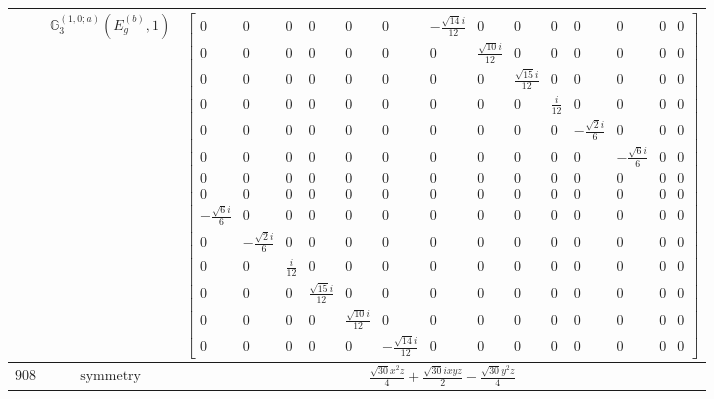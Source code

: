 \documentclass[fleqn,8pt,landscape]{jsarticle}
\begin{document}
\begin{longtable}{ccc}
$  $ & $ \mathbb{G}_{3}^{(1,0;a)}(E_{g}^{(b)},1) $ & $ \begin{bmatrix} 0 & 0 & 0 & 0 & 0 & 0 & - \frac{\sqrt{14} i}{12} & 0 & 0 & 0 & 0 & 0 & 0 & 0 \\ 0 & 0 & 0 & 0 & 0 & 0 & 0 & \frac{\sqrt{10} i}{12} & 0 & 0 & 0 & 0 & 0 & 0 \\ 0 & 0 & 0 & 0 & 0 & 0 & 0 & 0 & \frac{\sqrt{15} i}{12} & 0 & 0 & 0 & 0 & 0 \\ 0 & 0 & 0 & 0 & 0 & 0 & 0 & 0 & 0 & \frac{i}{12} & 0 & 0 & 0 & 0 \\ 0 & 0 & 0 & 0 & 0 & 0 & 0 & 0 & 0 & 0 & - \frac{\sqrt{2} i}{6} & 0 & 0 & 0 \\ 0 & 0 & 0 & 0 & 0 & 0 & 0 & 0 & 0 & 0 & 0 & - \frac{\sqrt{6} i}{6} & 0 & 0 \\ 0 & 0 & 0 & 0 & 0 & 0 & 0 & 0 & 0 & 0 & 0 & 0 & 0 & 0 \\ 0 & 0 & 0 & 0 & 0 & 0 & 0 & 0 & 0 & 0 & 0 & 0 & 0 & 0 \\ - \frac{\sqrt{6} i}{6} & 0 & 0 & 0 & 0 & 0 & 0 & 0 & 0 & 0 & 0 & 0 & 0 & 0 \\ 0 & - \frac{\sqrt{2} i}{6} & 0 & 0 & 0 & 0 & 0 & 0 & 0 & 0 & 0 & 0 & 0 & 0 \\ 0 & 0 & \frac{i}{12} & 0 & 0 & 0 & 0 & 0 & 0 & 0 & 0 & 0 & 0 & 0 \\ 0 & 0 & 0 & \frac{\sqrt{15} i}{12} & 0 & 0 & 0 & 0 & 0 & 0 & 0 & 0 & 0 & 0 \\ 0 & 0 & 0 & 0 & \frac{\sqrt{10} i}{12} & 0 & 0 & 0 & 0 & 0 & 0 & 0 & 0 & 0 \\ 0 & 0 & 0 & 0 & 0 & - \frac{\sqrt{14} i}{12} & 0 & 0 & 0 & 0 & 0 & 0 & 0 & 0 \end{bmatrix} $ \\ \hline
$ 908 $ & $ \text{symmetry} $ & $ \frac{\sqrt{30} x^{2} z}{4} + \frac{\sqrt{30} i x y z}{2} - \frac{\sqrt{30} y^{2} z}{4} $ \\

\end{longtable}
\end{document}
